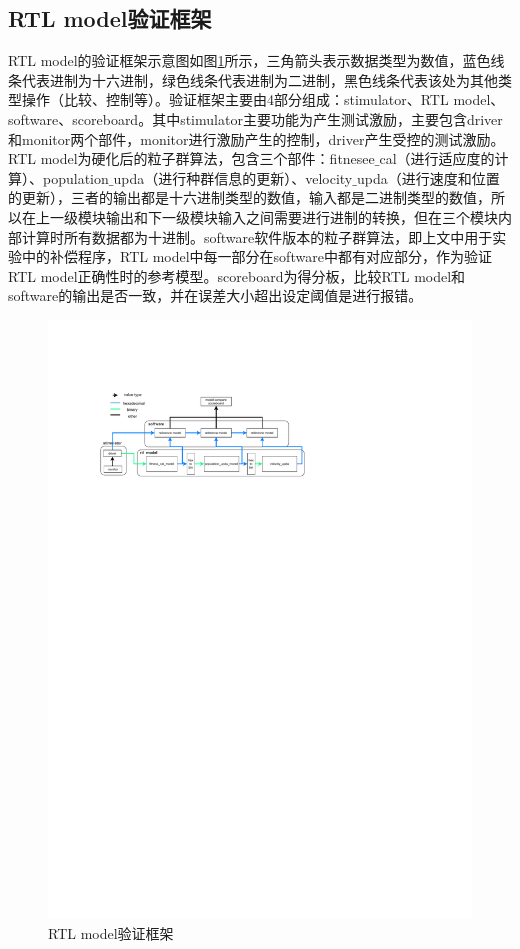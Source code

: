\subsection{RTL model验证框架}
\label{RTL model验证框架}
RTL model的验证框架示意图如图\ref{fig:RTL model验证框架}所示，三角箭头表示数据类型为数值，蓝色线条代表进制为十六进制，绿色线条代表进制为二进制，黑色线条代表该处为其他类型操作（比较、控制等）。验证框架主要由4部分组成：stimulator、RTL model、software、scoreboard。其中stimulator主要功能为产生测试激励，主要包含driver和monitor两个部件，monitor进行激励产生的控制，driver产生受控的测试激励。RTL model为硬化后的粒子群算法，包含三个部件：fitnesee$\_$cal（进行适应度的计算）、population$\_$upda（进行种群信息的更新）、velocity$\_$upda（进行速度和位置的更新），三者的输出都是十六进制类型的数值，输入都是二进制类型的数值，所以在上一级模块输出和下一级模块输入之间需要进行进制的转换，但在三个模块内部计算时所有数据都为十进制。software软件版本的粒子群算法，即上文中用于实验中的补偿程序，RTL model中每一部分在software中都有对应部分，作为验证RTL model正确性时的参考模型。scoreboard为得分板，比较RTL model和software的输出是否一致，并在误差大小超出设定阈值是进行报错。
\begin{figure}[htb]
  \centering
  \includegraphics[width=14cm]{fig/4-fig/rtl_model验证环境.drawio.pdf}
  \caption{RTL model验证框架}
  \label{fig:RTL model验证框架}
\end{figure}

